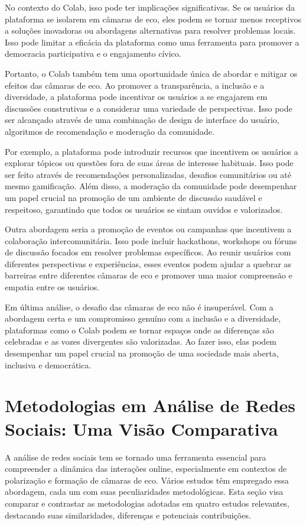 No contexto do Colab, isso pode ter implicações significativas. Se os usuários da plataforma se isolarem em câmaras de eco, eles podem se tornar menos receptivos a soluções inovadoras ou abordagens alternativas para resolver problemas locais. Isso pode limitar a eficácia da plataforma como uma ferramenta para promover a democracia participativa e o engajamento cívico.

Portanto, o Colab também tem uma oportunidade única de abordar e mitigar os efeitos das câmaras de eco. Ao promover a transparência, a inclusão e a diversidade, a plataforma pode incentivar os usuários a se engajarem em discussões construtivas e a considerar uma variedade de perspectivas. Isso pode ser alcançado através de uma combinação de design de interface do usuário, algoritmos de recomendação e moderação da comunidade.

Por exemplo, a plataforma pode introduzir recursos que incentivem os usuários a explorar tópicos ou questões fora de suas áreas de interesse habituais. Isso pode ser feito através de recomendações personalizadas, desafios comunitários ou até mesmo gamificação. Além disso, a moderação da comunidade pode desempenhar um papel crucial na promoção de um ambiente de discussão saudável e respeitoso, garantindo que todos os usuários se sintam ouvidos e valorizados.

Outra abordagem seria a promoção de eventos ou campanhas que incentivem a colaboração intercomunitária. Isso pode incluir hackathons, workshops ou fóruns de discussão focados em resolver problemas específicos. Ao reunir usuários com diferentes perspectivas e experiências, esses eventos podem ajudar a quebrar as barreiras entre diferentes câmaras de eco e promover uma maior compreensão e empatia entre os usuários.

Em última análise, o desafio das câmaras de eco não é insuperável. Com a abordagem certa e um compromisso genuíno com a inclusão e a diversidade, plataformas como o Colab podem se tornar espaços onde as diferenças são celebradas e as vozes divergentes são valorizadas. Ao fazer isso, elas podem desempenhar um papel crucial na promoção de uma sociedade mais aberta, inclusiva e democrática.

\section{Metodologias em Análise de Redes Sociais: Uma Visão Comparativa}

A análise de redes sociais tem se tornado uma ferramenta essencial para compreender a dinâmica das interações online, especialmente em contextos de polarização e formação de câmaras de eco. Vários estudos têm empregado essa abordagem, cada um com suas peculiaridades metodológicas. Esta seção visa comparar e contrastar as metodologias adotadas em quatro estudos relevantes, destacando suas similaridades, diferenças e potenciais contribuições.

